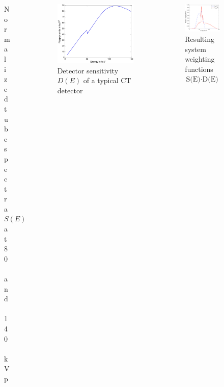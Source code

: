 \begin{frame}
\begin{columns}[c, onlytextwidth]
\begin{column}{0.33\textwidth}
\begin{figure}[]
                \caption{Normalized tube spectra $S(E)$ at 80~and~140~kVp}%
                \label{fig:k}
            \end{figure}
        \end{column}\begin{column}{0.33\textwidth}
            \begin{figure}[]
                \centering
                \includegraphics[width=\textwidth]{images/dual2.eps}
                \caption{Detector sensitivity $D(E)$ of a typical CT detector}
            \end{figure}
        \end{column}\begin{column}{0.33\textwidth}
            \begin{figure}[]
                \centering
                \includegraphics[width=\textwidth]{images/dual3.eps}
                \caption{Resulting system weighting functions $\text{S(E)}\cdot\text{D(E)}$}
            \end{figure}
        \end{column}
    \end{columns}
\end{frame}

